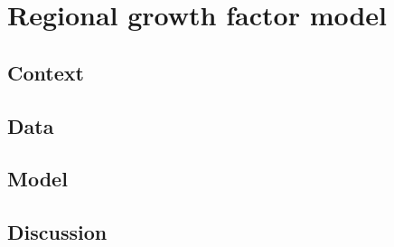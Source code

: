 \section{Regional growth factor model}%
\label{sec:regional_growth_factor_model}

\subsection{Context}
\subsection{Data}
\subsection{Model}
\subsection{Discussion}

